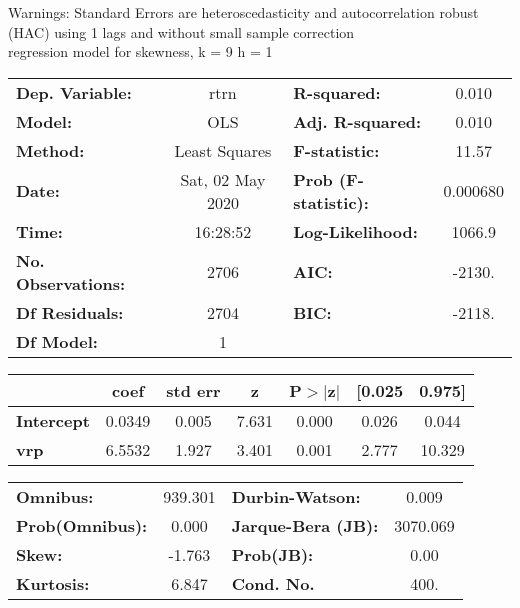 Warnings: \newline
 [1] Standard Errors are heteroscedasticity and autocorrelation robust (HAC) using 1 lags and without small sample correction\\ 

regression model for skewness, k = 9 h = 1\begin{center}
\begin{tabular}{lclc}
\toprule
\textbf{Dep. Variable:}    &       rtrn       & \textbf{  R-squared:         } &     0.010   \\
\textbf{Model:}            &       OLS        & \textbf{  Adj. R-squared:    } &     0.010   \\
\textbf{Method:}           &  Least Squares   & \textbf{  F-statistic:       } &     11.57   \\
\textbf{Date:}             & Sat, 02 May 2020 & \textbf{  Prob (F-statistic):} &  0.000680   \\
\textbf{Time:}             &     16:28:52     & \textbf{  Log-Likelihood:    } &    1066.9   \\
\textbf{No. Observations:} &        2706      & \textbf{  AIC:               } &    -2130.   \\
\textbf{Df Residuals:}     &        2704      & \textbf{  BIC:               } &    -2118.   \\
\textbf{Df Model:}         &           1      & \textbf{                     } &             \\
\bottomrule
\end{tabular}
\begin{tabular}{lcccccc}
                   & \textbf{coef} & \textbf{std err} & \textbf{z} & \textbf{P$> |$z$|$} & \textbf{[0.025} & \textbf{0.975]}  \\
\midrule
\textbf{Intercept} &       0.0349  &        0.005     &     7.631  &         0.000        &        0.026    &        0.044     \\
\textbf{vrp}       &       6.5532  &        1.927     &     3.401  &         0.001        &        2.777    &       10.329     \\
\bottomrule
\end{tabular}
\begin{tabular}{lclc}
\textbf{Omnibus:}       & 939.301 & \textbf{  Durbin-Watson:     } &    0.009  \\
\textbf{Prob(Omnibus):} &   0.000 & \textbf{  Jarque-Bera (JB):  } & 3070.069  \\
\textbf{Skew:}          &  -1.763 & \textbf{  Prob(JB):          } &     0.00  \\
\textbf{Kurtosis:}      &   6.847 & \textbf{  Cond. No.          } &     400.  \\
\bottomrule
\end{tabular}
\end{center}

